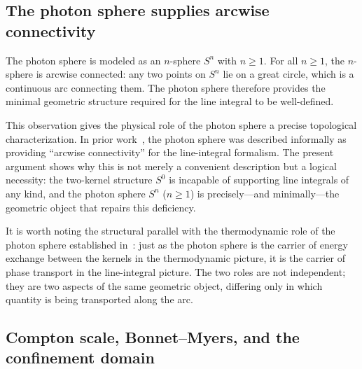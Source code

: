 \documentclass[%
 reprint, amsmath,amssymb, aps, prb, ]{revtex4-2}
\numberwithin{equation}{section}
\begin{document}
\subsection{The photon sphere supplies arcwise connectivity}
\label{subsec:photon_sphere_arcwise}

The photon sphere is modeled as an $n$-sphere $S^n$ with $n\geq 1$. For all $n\geq 1$, the $n$-sphere is arcwise connected: any two points on $S^n$ lie on a great circle, which is a continuous arc connecting them. The photon sphere therefore provides the minimal geometric structure required for the line integral to be well-defined.

This observation gives the physical role of the photon sphere a precise topological characterization. In prior work~\cite{hanamura34}, the photon sphere was described informally as providing ``arcwise connectivity'' for the line-integral formalism. The present argument shows why this is not merely a convenient description but a logical necessity: the two-kernel structure $S^0$ is incapable of supporting line integrals of any kind, and the photon sphere $S^n$ ($n\geq 1$) is precisely---and minimally---the geometric object that repairs this deficiency.

It is worth noting the structural parallel with the thermodynamic role of the photon sphere established in~\cite{hanamura01}: just as the photon sphere is the carrier of energy exchange between the kernels in the thermodynamic picture, it is the carrier of phase transport in the line-integral picture. The two roles are not independent; they are two aspects of the same geometric object, differing only in which quantity is being transported along the arc.

\subsection{Compton scale, Bonnet--Myers, and the confinement domain}
\label{subsec:bonnet_myers}
\end{document}
